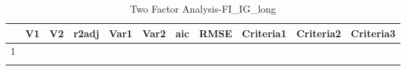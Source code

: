 \begin{longtable}{rllrrrrrlll}
  \hline
 & V1 & V2 & r2adj & Var1 & Var2 & aic & RMSE & Criteria1 & Criteria2 & Criteria3 \\ 
  \hline
1 &  &  &  &  &  &  &  &  &  &  \\ 
   \hline
\hline
\caption{Two Factor Analysis-FI_IG_long} 
\end{longtable}

